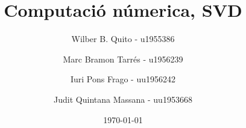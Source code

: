 \documentclass[12pt]{article}
\title{Computació númerica, SVD}
\date{\today}
\author{
  	Wilber B. Quito - u1955386\\
  	\and
  	Marc Bramon Tarrés - u1956239\\
	\and
  	Iuri Pons Frago - uu1956242\\
	\and
  	Judit Quintana Massana - uu1953668\\
}
\begin{document}
\maketitle

\pagebreak
\end{document}
